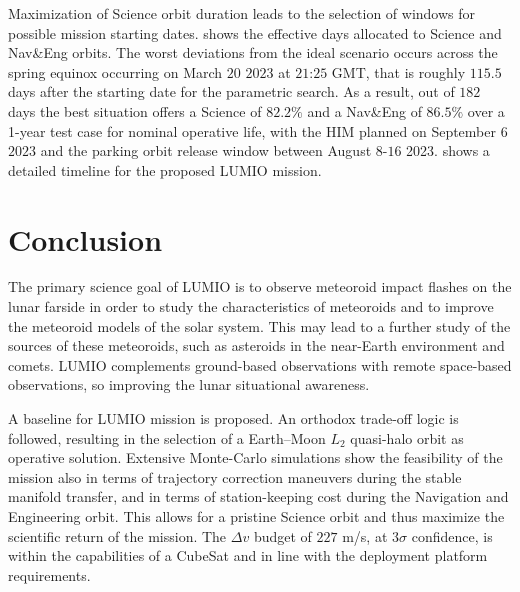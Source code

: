 Maximization of Science orbit duration leads to the selection of windows for possible mission starting dates.  shows the effective days allocated to Science and Nav\&Eng orbits. The worst deviations from the ideal scenario occurs across the spring equinox occurring on March $20$ $2023$ at $21$:$25$ GMT, that is roughly $115.5$ days after the starting date for the parametric search. As a result, out of $182$ days the best situation offers a Science of $82.2\%$ and a Nav\&Eng of $86.5\%$ over a 1-year test case for nominal operative life, with the {HIM} planned on September $6$ $2023$ and the parking orbit release window between August $8$-$16$ 2023.  shows a detailed timeline for the proposed LUMIO mission.


\section{Conclusion}\label{sec:cncls}
The primary science goal of LUMIO is to observe meteoroid impact flashes on the lunar farside in order to study the characteristics of meteoroids and to improve the meteoroid models of the solar system. This may lead to a further study of the sources of these meteoroids, such as asteroids in the near-Earth environment and comets. LUMIO complements ground-based observations with remote space-based observations, so improving the lunar situational awareness. 

A baseline for LUMIO mission is proposed. An orthodox trade-off logic is followed, resulting in the selection of a Earth--Moon $L_2$ quasi-halo orbit as operative solution. Extensive Monte-Carlo simulations show the feasibility of the mission also in terms of trajectory correction maneuvers during the stable manifold transfer, and in terms of station-keeping cost during the Navigation and Engineering orbit. This allows for a pristine Science orbit and thus maximize the scientific return of the mission. The $\Delta v$ budget of $227$ m/s, at $3\sigma$ confidence, is within the capabilities of a CubeSat and in line with the deployment platform requirements.

